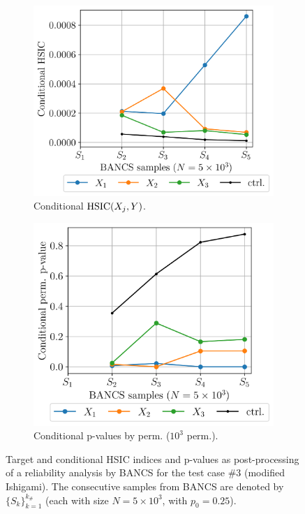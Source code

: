 \begin{figure}
\begin{subfigure}[b]{0.48\linewidth}
    \end{subfigure}
    \\[20pt]
    \begin{subfigure}[b]{0.48\linewidth}
        \centering
        \includegraphics[width=\linewidth]{part3/figures/BANCS/ishigami_CHSIC.png}
        \caption{Conditional $\mathrm{HSIC}(X_j, Y)$.}
    \end{subfigure}
    \begin{subfigure}[b]{0.48\linewidth}
        \centering
        \includegraphics[width=\linewidth]{part3/figures/BANCS/ishigami_Cpvalue_permutation.png}
        \caption{Conditional p-values by perm. ($10^3$ perm.).}
    \end{subfigure}
    \caption{Target and conditional HSIC indices and p-values as post-processing of a reliability analysis by BANCS for the test case \#3 (modified Ishigami). 
                The consecutive samples from BANCS are denoted by $\{S_k\}_{k=1}^{k_\#}$ (each with size $N=5\times10^3$, with $p_0=0.25$).}
    \label{fig:rosa_ishigami}
\end{figure}


